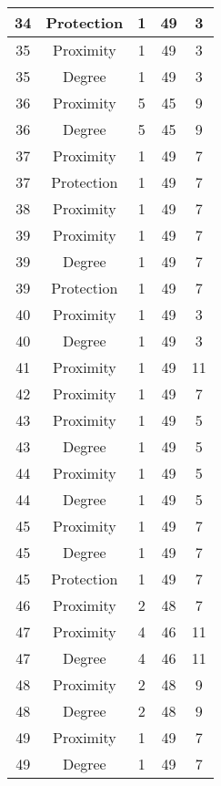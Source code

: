 \documentclass[results.tex]{subfiles}
\begin{document}
\begin{center}
\begin{tabular}{| c || c | c | c | c |}
    34 & Protection & 1 & 49 & 3 \\ 
    \hline
    35 & Proximity & 1 & 49 & 3 \\ 
    \hline
    35 & Degree & 1 & 49 & 3 \\ 
    \hline
    36 & Proximity & 5 & 45 & 9 \\ 
    \hline
    36 & Degree & 5 & 45 & 9 \\ 
    \hline
    37 & Proximity & 1 & 49 & 7 \\ 
    \hline
    37 & Protection & 1 & 49 & 7 \\ 
    \hline
    38 & Proximity & 1 & 49 & 7 \\ 
    \hline
    39 & Proximity & 1 & 49 & 7 \\ 
    \hline
    39 & Degree & 1 & 49 & 7 \\ 
    \hline
    39 & Protection & 1 & 49 & 7 \\ 
    \hline
    40 & Proximity & 1 & 49 & 3 \\ 
    \hline
    40 & Degree & 1 & 49 & 3 \\ 
    \hline
    41 & Proximity & 1 & 49 & 11 \\ 
    \hline
    42 & Proximity & 1 & 49 & 7 \\ 
    \hline
    43 & Proximity & 1 & 49 & 5 \\ 
    \hline
    43 & Degree & 1 & 49 & 5 \\ 
    \hline
    44 & Proximity & 1 & 49 & 5 \\ 
    \hline
    44 & Degree & 1 & 49 & 5 \\ 
    \hline
    45 & Proximity & 1 & 49 & 7 \\ 
    \hline
    45 & Degree & 1 & 49 & 7 \\ 
    \hline
    45 & Protection & 1 & 49 & 7 \\ 
    \hline
    46 & Proximity & 2 & 48 & 7 \\ 
    \hline
    47 & Proximity & 4 & 46 & 11 \\ 
    \hline
    47 & Degree & 4 & 46 & 11 \\ 
    \hline
    48 & Proximity & 2 & 48 & 9 \\ 
    \hline
    48 & Degree & 2 & 48 & 9 \\ 
    \hline
    49 & Proximity & 1 & 49 & 7 \\ 
    \hline
    49 & Degree & 1 & 49 & 7 \\ 
    \hline   \end{tabular}
\end{center}
\end{document}

